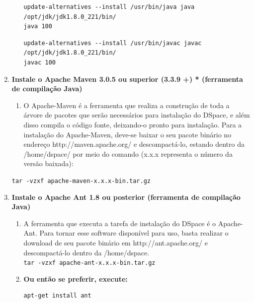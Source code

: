 \documentclass[12pt,hidelinks]{article}
\begin{document}
\begin{enumerate}
\begin{enumerate}
        \begin{verbatim}
update-alternatives --install /usr/bin/java java /opt/jdk/jdk1.8.0_221/bin/
java 100
        \end{verbatim}
        
        \begin{verbatim}
update-alternatives --install /usr/bin/javac javac /opt/jdk/jdk1.8.0_221/bin/
javac 100
        \end{verbatim}

        \end{enumerate}
     
        
    \item \textbf{Instale o Apache Maven 3.0.5 ou superior (3.3.9 +) * (ferramenta de compilação Java)}\\
        \begin{enumerate}
            \item O Apache-Maven é a ferramenta que realiza a construção de toda a árvore de pacotes que serão necessários para instalação do DSpace, e além disso compila o código fonte, deixando-o pronto para instalação. Para a instalação do Apache-Maven, deve-se baixar o seu pacote binário no endereço http://maven.apache.org/ e descompactá-lo, estando dentro da /home/dspace/ por meio do comando (x.x.x representa o número da versão baixada):
        \end{enumerate}
        
            \texttt{tar -vzxf apache-maven-x.x.x-bin.tar.gz}\\
        
        
    \item \textbf{ Instale o Apache Ant 1.8 ou posterior (ferramenta de compilação Java)}\\
         \begin{enumerate}
            \item A ferramenta que executa a tarefa de instalação do DSpace é o Apache-Ant. Para tornar esse software disponível para uso, basta realizar o download de seu pacote binário em http://ant.apache.org/ e descompactá-lo dentro da /home/dspace.\\
            
                \texttt{tar -vzxf apache-ant-x.x.x-bin.tar.gz}\\
            
            \item \textbf{Ou então se preferir, execute:}\\
                \begin{verbatim}
apt-get install ant
                \end{verbatim}
            

\end{enumerate}
\end{enumerate}
\end{document}
